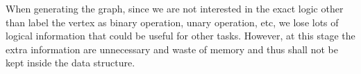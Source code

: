 \documentclass{article}
\begin{document}
When generating the graph, since we are not interested in the exact logic other than label
the vertex as binary operation, unary operation, etc, we lose lots of logical information
that could be useful for other tasks. However, at this stage the extra information are
unnecessary and waste of memory and thus shall not be kept inside the data structure.
\end{document}
